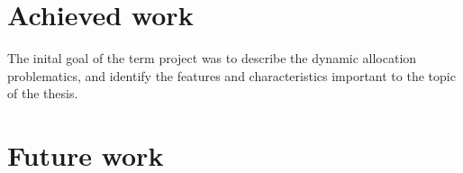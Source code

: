 \section{Achieved work}
The inital goal of the term project was to describe the dynamic allocation problematics, and identify the features and characteristics important to the topic of the thesis.
\section{Future work}
